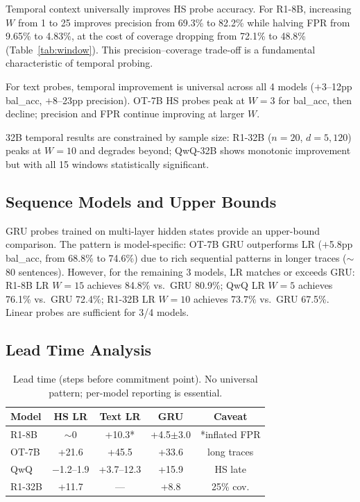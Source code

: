 \documentclass[11pt]{article}
\begin{document}
Temporal context universally improves HS probe accuracy.
For R1-8B, increasing $W$ from 1 to 25 improves precision from 69.3\% to 82.2\% while halving FPR from 9.65\% to 4.83\%, at the cost of coverage dropping from 72.1\% to 48.8\% (Table~\ref{tab:window}).
This precision--coverage trade-off is a fundamental characteristic of temporal probing.

For text probes, temporal improvement is universal across all 4 models ($+$3--12pp bal\_acc, $+$8--23pp precision).
OT-7B HS probes peak at $W{=}3$ for bal\_acc, then decline; precision and FPR continue improving at larger $W$.

32B temporal results are constrained by sample size: R1-32B ($n{=}20$, $d{=}5{,}120$) peaks at $W{=}10$ and degrades beyond; QwQ-32B shows monotonic improvement but with all 15 windows statistically significant.


\subsection{Sequence Models and Upper Bounds}

GRU probes trained on multi-layer hidden states provide an upper-bound comparison.
The pattern is model-specific: OT-7B GRU outperforms LR ($+$5.8pp bal\_acc, from 68.8\% to 74.6\%) due to rich sequential patterns in longer traces ($\sim$80 sentences).
However, for the remaining 3 models, LR matches or exceeds GRU: R1-8B LR $W{=}15$ achieves 84.8\% vs.\ GRU 80.9\%; QwQ LR $W{=}5$ achieves 76.1\% vs.\ GRU 72.4\%; R1-32B LR $W{=}10$ achieves 73.7\% vs.\ GRU 67.5\%.
Linear probes are sufficient for 3/4 models.


\subsection{Lead Time Analysis}

\begin{table}[t]
\centering
\small
\begin{tabular}{@{}lcccc@{}}
\toprule
\textbf{Model} & \textbf{HS LR} & \textbf{Text LR} & \textbf{GRU} & \textbf{Caveat} \\
\midrule
R1-8B & $\sim$0 & +10.3* & +4.5$\pm$3.0 & *inflated FPR \\
OT-7B & +21.6 & +45.5 & +33.6 & long traces \\
QwQ & $-$1.2--1.9 & +3.7--12.3 & +15.9 & HS late \\
R1-32B & +11.7 & --- & +8.8 & 25\% cov. \\
\bottomrule
\end{tabular}
\caption{Lead time (steps before commitment point). No universal pattern; per-model reporting is essential.}
\label{tab:lead}
\end{table}
\end{document}
